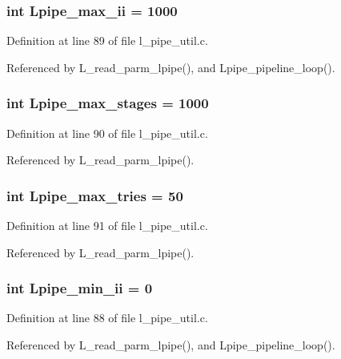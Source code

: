 \subsubsection{\setlength{\rightskip}{0pt plus 5cm}int \bf{Lpipe\_\-max\_\-ii} = 1000}\label{l__pipe__util_8c_971e2f43a9bcf87d02ca3adb1f632358}




Definition at line 89 of file l\_\-pipe\_\-util.c.

Referenced by L\_\-read\_\-parm\_\-lpipe(), and Lpipe\_\-pipeline\_\-loop().
\subsubsection{\setlength{\rightskip}{0pt plus 5cm}int \bf{Lpipe\_\-max\_\-stages} = 1000}\label{l__pipe__util_8c_d36c8bdff7baceb8d1cb7853c908bf03}




Definition at line 90 of file l\_\-pipe\_\-util.c.

Referenced by L\_\-read\_\-parm\_\-lpipe().
\subsubsection{\setlength{\rightskip}{0pt plus 5cm}int \bf{Lpipe\_\-max\_\-tries} = 50}\label{l__pipe__util_8c_b20efb4ff31868be5a5b0c3039351158}




Definition at line 91 of file l\_\-pipe\_\-util.c.

Referenced by L\_\-read\_\-parm\_\-lpipe().
\subsubsection{\setlength{\rightskip}{0pt plus 5cm}int \bf{Lpipe\_\-min\_\-ii} = 0}\label{l__pipe__util_8c_05fca7cb5ae9510942db3f6c0307a355}




Definition at line 88 of file l\_\-pipe\_\-util.c.

Referenced by L\_\-read\_\-parm\_\-lpipe(), and Lpipe\_\-pipeline\_\-loop().
